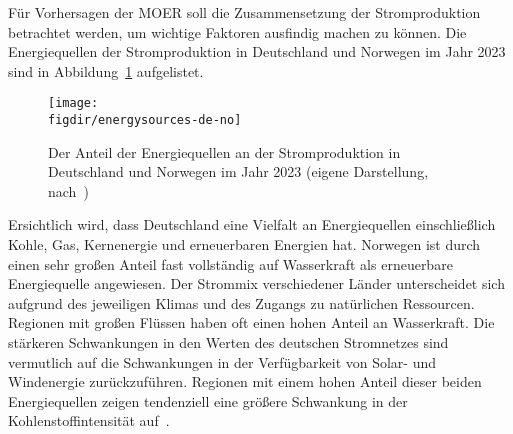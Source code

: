 
Für Vorhersagen der \ac{MOER} soll die Zusammensetzung der Stromproduktion betrachtet werden, um wichtige Faktoren ausfindig machen zu können.
Die Energiequellen der Stromproduktion in Deutschland und Norwegen im Jahr 2023 sind in Abbildung~\ref{FIG:energysources-de-no} aufgelistet.
\begin{figure}
 \caption[Energiequellen der Strompoduktion von Deutschland und Norwegen 2023]{Der Anteil der Energiequellen an der Stromproduktion in Deutschland und Norwegen im Jahr 2023 (eigene Darstellung, nach~\cite{ElectricityMaps.20240305T20:54:29.000Z})}
 {\texttt{[image: \\figdir/energysources-de-no]}}
 \label{FIG:energysources-de-no}
\end{figure}
Ersichtlich wird, dass Deutschland eine Vielfalt an Energiequellen einschließlich Kohle, Gas, Kernenergie und erneuerbaren Energien hat.
Norwegen ist durch einen sehr großen Anteil fast vollständig auf Wasserkraft als erneuerbare Energiequelle angewiesen.
Der Strommix verschiedener Länder unterscheidet sich aufgrund des jeweiligen Klimas und des Zugangs zu natürlichen Ressourcen.
Regionen mit großen Flüssen haben oft einen hohen Anteil an Wasserkraft.
Die stärkeren Schwankungen in den Werten des deutschen Stromnetzes sind vermutlich auf die Schwankungen in der Verfügbarkeit von Solar- und Windenergie zurückzuführen.
Regionen mit einem hohen Anteil dieser beiden Energiequellen zeigen tendenziell eine größere Schwankung in der Kohlenstoffintensität auf~\cite{Sukprasert.2023}.

